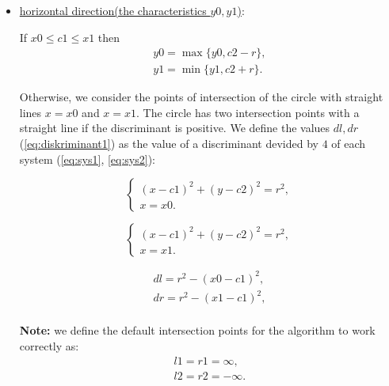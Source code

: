 \documentclass{report}
\begin{document}
\begin{itemize}
	
	\item \underline {horizontal direction(the characteristics $y0, y1$)}:
	
	If   $x0 \le c1\le x1$ then
	\begin{equation}
		\begin{gathered}
			y0 = \max\{y0, c2-r\},\\
			y1 = \min\{y1, c2+r\}.
		\end{gathered}
	\end{equation}
	
	Otherwise, we consider the points of intersection of the circle with straight lines $x = x0$ and $x = x1$. The circle has two intersection points with a straight line if the discriminant is positive. We define the values $dl, dr$ (\ref{eq:diskriminant1}) as the value of a discriminant devided by  $4$ of each system (\ref{eq:sys1}, \ref{eq:sys2}):
	
	\begin{equation}
		\begin{cases}
			(x - c1)^2 + (y - c2)^2 = r^2,\\ 
			x = x0.
		\end{cases}
		\label{eq:sys1}
	\end{equation}
	
	\begin{equation}
		\begin{cases}
			(x - c1)^2 + (y - c2)^2 = r^2,\\ 
			x = x1.
		\end{cases}
		\label{eq:sys2}
	\end{equation}
	
	\begin{equation}
		\begin{gathered}
			dl = r^2 - (x0 - c1)^2,\\
			dr = r^2 - (x1 - c1)^2,\\
			\label{eq:diskriminant1}
		\end{gathered}
	\end{equation}
	
	{\bfseries Note:} we define the default intersection points for the algorithm to work correctly as:
	\begin{equation}
		\begin{gathered}
			l1 = r1 =  \infty,\\
			l2 = r2 = -\infty.
			\label{eq:lrinf}
		\end{gathered}
	\end{equation}
	

\end{itemize}
\end{document}
